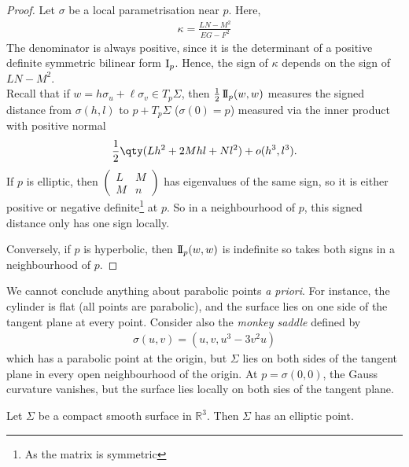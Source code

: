 \begin{proof}
	Let $\sigma$ be a local parametrisation near $p$.
	Here,
	\begin{align*}
		\kappa = \frac{LN-M^2}{EG-F^2}
	\end{align*}
	The denominator is always positive, since it is the determinant of a positive definite symmetric bilinear form $\operatorname{\mathrm{I}}_p$.
	Hence, the sign of $\kappa$ depends on the sign of $LN-M^2$. \\
	Recall that if $w = h \sigma_u + \ell \sigma_v \in T_p \Sigma$, then $\frac{1}{2} \operatorname{\mathrm{I\!I}}_p(w,w)$ measures the signed distance from $\sigma(h,l)$ to $p + T_p \Sigma$ ($\sigma(0) = p$) measured via the inner product with positive normal
	\begin{align*}
		\frac{1}{2} \qty(L h^2 + 2 Mhl + Nl^2) + o(h^3, l^3).
	\end{align*} 
	If $p$ is elliptic, then $\begin{pmatrix}L & M \\M & n\end{pmatrix}$ has eigenvalues of the same sign, so it is either positive or negative definite\footnote{As the matrix is symmetric} at $p$.
	So in a neighbourhood of $p$, this signed distance only has one sign locally.

	Conversely, if $p$ is hyperbolic, then $\operatorname{\mathrm{I\!I}}_p(w,w)$ is indefinite so takes both signs in a neighbourhood of $p$.
\end{proof}

\begin{remark}
	We cannot conclude anything about parabolic points \textit{a priori}.
	For instance, the cylinder is flat (all points are parabolic), and the surface lies on one side of the tangent plane at every point.
	Consider also the \textit{monkey saddle} defined by
	\begin{align*}
		\sigma(u,v) = (u,v,u^3 - 3v^2 u)
	\end{align*}
	which has a parabolic point at the origin, but $\Sigma$ lies on both sides of the tangent plane in every open neighbourhood of the origin.
	At $p = \sigma(0,0)$, the Gauss curvature vanishes, but the surface lies locally on both sies of the tangent plane.
\end{remark}

\begin{proposition}
	Let $\Sigma$ be a compact smooth surface in $\mathbb R^3$.
	Then $\Sigma$ has an elliptic point.
\end{proposition}

